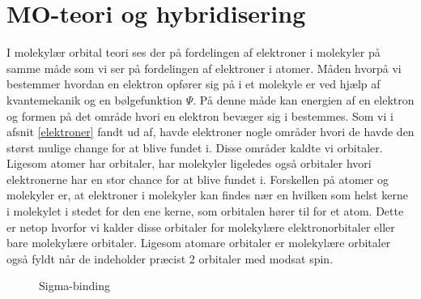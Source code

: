 \section{MO-teori og hybridisering}
I molekylær orbital teori ses der på fordelingen af elektroner i molekyler på samme måde som vi ser på fordelingen af elektroner i atomer. Måden hvorpå vi bestemmer hvordan en elektron opfører sig på i et molekyle er ved hjælp af kvantemekanik og en bølgefunktion $\Psi$. På denne måde kan energien af en elektron og formen på det område hvori en elektron bevæger sig i bestemmes. Som vi i afsnit \ref{elektroner} fandt ud af, havde elektroner nogle områder hvori de havde den størst mulige change for at blive fundet i. Disse områder kaldte vi orbitaler. Ligesom atomer har orbitaler, har molekyler ligeledes også orbitaler hvori elektronerne har en stor chance for at blive fundet i. Forskellen på atomer og molekyler er, at elektroner i molekyler kan findes nær en hvilken som helst kerne i molekylet i stedet for den ene kerne, som orbitalen hører til for et atom. Dette er netop hvorfor vi kalder disse orbitaler for molekylære elektronorbitaler eller bare molekylære orbitaler. Ligesom atomare orbitaler er molekylære orbitaler også fyldt når de indeholder præcist 2 orbitaler med modsat spin. 
\\

\begin{wrapfigure}{r}{0.55\textwidth}
  \centering
  \caption{Sigma-binding \label{fig:sigmabinding}}
   \end{wrapfigure}

